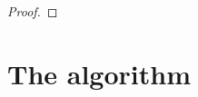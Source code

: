 \documentclass{article} %
\begin{document}
\begin{proof}
\end{proof}



\section{The algorithm}
\label{sec:algo}

\end{document}

